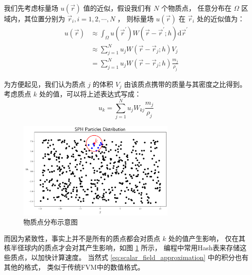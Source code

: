 \begin{frame}
    我们先考虑标量场 $u(\vec{r})$ 值的近似，假设我们有 $N$ 个物质点，
    任意分布在 $\Omega$ 区域内，其位置分别为 $\vec{r}_i, i = 1, 2, \cdots, N$ ，
    则标量场 $u(\vec{r})$ 在 $\vec{r}_i$ 处的近似值为：
    \begin{equation}
        \label{eq:scalar_field_approximation}
        \begin{aligned}
            u(\vec{r})&\approx \int_{\Omega} u(\vec{r}^\prime) 
                W(\vec{r} - \vec{r}^\prime;h) \mathrm{d}\vec{r}^\prime\\
            &\approx
            \sum_{j=1}^{N} u_j W(\vec{r} - \vec{r}_j;h) V_j\\
            &=
            \sum_{j=1}^{N} u_j W(\vec{r} - \vec{r}_j;h) \frac{m_j}{\rho_j}
        \end{aligned}
    \end{equation}

    为方便起见，我们认为质点 $j$ 的体积 $V_j$ 由该质点携带的质量与其密度之比得到。
    考虑质点 $k$ 处的值，可以将上述表达式写成：
    \begin{equation}
        u_k = \sum_{j=1}^{N} u_j W_{kj} \frac{m_j}{\rho_j}
    \end{equation}
\end{frame}

\begin{frame}
    \begin{figure}[H]
        \includegraphics[width=0.7\textwidth]{images/sph_particles_distribution.png}
        \caption{物质点分布示意图}
        \label{fig:particles_distribution}
    \end{figure}
    而因为紧致性，事实上并不是所有的质点都会对质点 $k$ 处的值产生影响，
    仅在其核半径球内的质点才会对其产生影响，如图 \ref{fig:particles_distribution} 所示，
    编程中常用Hash表来存储这些质点，以加快计算速度。
    当然式 \ref{eq:scalar_field_approximation} 中的积分也有其他的格式，
    类似于传统FVM中的数值格式。
\end{frame}

